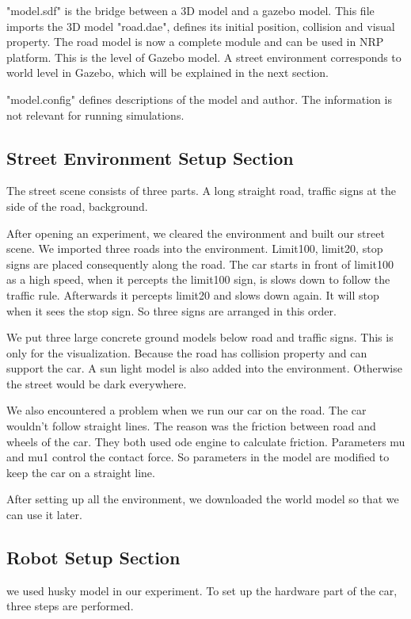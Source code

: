 "model.sdf" is the bridge between a 3D model and a gazebo model. This file imports the 3D model "road.dae", defines its initial position, collision and visual property. The road model is now a complete module and can be used in NRP platform. This is the level of Gazebo model. A street environment corresponds to world level in Gazebo, which will be explained in the next section.

"model.config" defines descriptions of the model and author. The information is not relevant for running simulations. 

\subsection{Street Environment Setup Section}
The street scene consists of three parts. A long straight road, traffic signs at the side of the road, background.

After opening an experiment, we cleared the environment and built our street scene. We imported three roads into the environment. Limit100, limit20, stop signs are placed consequently along the road. The car starts in front of limit100 as a high speed, when it percepts the limit100 sign, is slows down to follow the traffic rule. Afterwards it percepts limit20 and slows down again. It will stop when it sees the stop sign. So three signs are arranged in this order.


We put three large concrete ground models below road and traffic signs. This is only for the visualization. Because the road has collision property and can support the car. A sun light model is also added into the environment. Otherwise the street would be dark everywhere.

We also encountered a problem when we run our car on the road. The car wouldn't follow straight lines. The reason was the friction between road and wheels of the car. They both used ode engine to calculate friction. Parameters mu and mu1 control the contact force. So parameters in the model are modified to keep the car on a straight line. 

After setting up all the environment, we downloaded the world model so that we can use it later.


\subsection{Robot Setup Section}

we used husky model in our experiment. To set up the hardware part of the car, three steps are performed.


